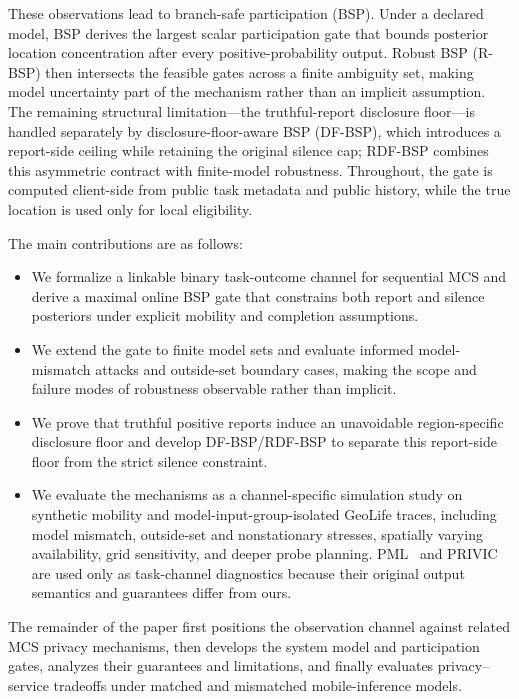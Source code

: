 \documentclass[10pt,journal,compsoc]{IEEEtran}
\begin{document}
These observations lead to branch-safe participation (BSP). Under a declared model, BSP derives the largest scalar participation gate that bounds posterior location concentration after every positive-probability output. Robust BSP (R-BSP) then intersects the feasible gates across a finite ambiguity set, making model uncertainty part of the mechanism rather than an implicit assumption. The remaining structural limitation---the truthful-report disclosure floor---is handled separately by disclosure-floor-aware BSP (DF-BSP), which introduces a report-side ceiling while retaining the original silence cap; RDF-BSP combines this asymmetric contract with finite-model robustness. Throughout, the gate is computed client-side from public task metadata and public history, while the true location is used only for local eligibility.

The main contributions are as follows:
\begin{itemize}
    \item We formalize a linkable binary task-outcome channel for sequential MCS and derive a maximal online BSP gate that constrains both report and silence posteriors under explicit mobility and completion assumptions.
    \item We extend the gate to finite model sets and evaluate informed model-mismatch attacks and outside-set boundary cases, making the scope and failure modes of robustness observable rather than implicit.
    \item We prove that truthful positive reports induce an unavoidable region-specific disclosure floor and develop DF-BSP/RDF-BSP to separate this report-side floor from the strict silence constraint.
    \item We evaluate the mechanisms as a channel-specific simulation study on synthetic mobility and model-input-group-isolated GeoLife traces, including model mismatch, outside-set and nonstationary stresses, spatially varying availability, grid sensitivity, and deeper probe planning. PML~\cite{pml2024} and PRIVIC~\cite{privic2024} are used only as task-channel diagnostics because their original output semantics and guarantees differ from ours.
\end{itemize}

The remainder of the paper first positions the observation channel against related MCS privacy mechanisms, then develops the system model and participation gates, analyzes their guarantees and limitations, and finally evaluates privacy--service tradeoffs under matched and mismatched mobile-inference models.
\end{document}
